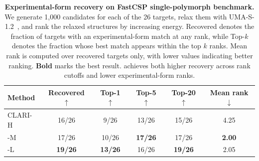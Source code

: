 
\begin{table}[t]
\centering
\caption{\textbf{Experimental-form recovery on FastCSP single-polymorph benchmark.}
We generate 1{,}000 candidates for each of the 26 targets, relax them with
UMA-S-1.2~\citep{wood2025family}, and rank the relaxed structures by increasing
energy. Recovered denotes the fraction of targets with an
experimental-form match at any rank, while Top-$k$ denotes the fraction whose
best match appears within the top $k$ ranks. Mean rank is computed over recovered
targets only, with lower values indicating better ranking. \textbf{Bold} marks
the best result. \model{} achieves both higher recovery across rank cutoffs and
lower experimental-form ranks.}
\label{tab:fastcsp-single-ranking}
\begin{tabular}{lccccc}
\toprule
Method & Recovered $\uparrow$ & Top-1 $\uparrow$ & Top-5 $\uparrow$
& Top-20 $\uparrow$ & Mean rank $\downarrow$ \\
\midrule
CLARI-H & 16/26 & 9/26 & 13/26 & 15/26 & 4.25 \\
\rowcolor{mfTealFill}
\model{}-M & 17/26 & 10/26 & \textbf{17/26} & 17/26 & \textbf{2.00} \\
\rowcolor{mfTealFill}
\model{}-L & \textbf{19/26} & \textbf{13/26} & 16/26 & \textbf{19/26} & 2.05 \\
\bottomrule
\end{tabular}
\end{table}
